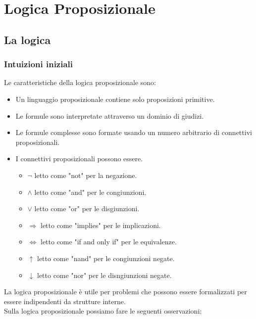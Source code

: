 \documentclass[../main.tex]{subfiles}
\begin{document}
    \part{Logica Proposizionale}
    \chapter{La logica}
    \section{Intuizioni iniziali}
    Le caratteristiche della logica proposizionale sono:
    \begin{itemize}
        \item Un linguaggio proposizionale contiene solo proposizioni primitive.
        \item Le formule sono interpretate attraverso un dominio di giudizi.
        \item Le formule complesse sono formate usando un numero arbitrario di connettivi proposizionali.
        \item I connettivi proposizionali possono essere.
        \begin{itemize}
            \item $\lnot$ letto come "not" per la negazione.
            \item $\land$ letto come "and" per le congiunzioni.
            \item $\lor$ letto come "or" per le disgiunzioni.
            \item $\Longrightarrow$ letto come "implies" per le implicazioni.
            \item $\Longleftrightarrow$ letto come "if and only if" per le equivalenze.
            \item $\uparrow$ letto come "nand" per le congiunzioni negate.
            \item $\downarrow$ letto come "nor" per le disngiunzioni negate.
        \end{itemize} 
    \end{itemize}
    La logica proposizionale è utile per problemi che possono essere formalizzati per essere indipendenti da strutture interne.\\
    Sulla logica proposizionale possiamo fare le seguenti osservazioni:
\end{document}
